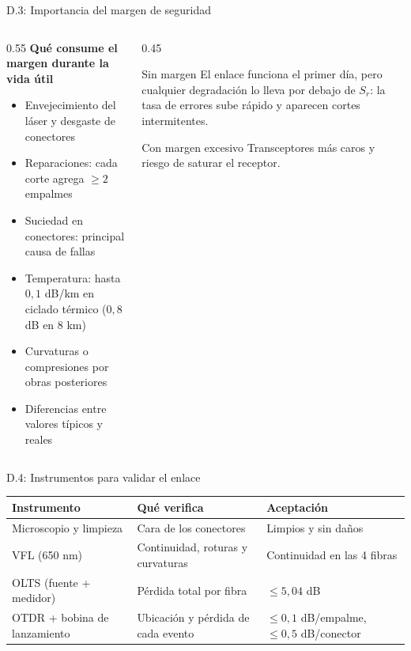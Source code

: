 \documentclass[aspectratio=1610]{beamer}
\begin{document}
\begin{frame}{D.3: Importancia del margen de seguridad}
  \begin{columns}[T]
    \begin{column}{0.55\textwidth}
      \textbf{Qué consume el margen durante la vida útil}
      \begin{itemize}
        \item Envejecimiento del láser y desgaste de conectores
        \item Reparaciones: cada corte agrega $\geq 2$ empalmes
        \item Suciedad en conectores: principal causa de fallas
        \item Temperatura: hasta $0{,}1$ dB/km en ciclado térmico ($0{,}8$ dB en 8 km)
        \item Curvaturas o compresiones por obras posteriores
        \item Diferencias entre valores típicos y reales
      \end{itemize}
    \end{column}
    \begin{column}{0.45\textwidth}
      \begin{block}{Sin margen}
        El enlace funciona el primer día, pero cualquier degradación lo lleva por debajo de $S_r$: la tasa de errores sube rápido y aparecen cortes intermitentes.
      \end{block}
      \begin{block}{Con margen excesivo}
        Transceptores más caros y riesgo de saturar el receptor.
      \end{block}
    \end{column}
  \end{columns}
\end{frame}

\begin{frame}{D.4: Instrumentos para validar el enlace}
  \small
  \begin{tabular}{>{\raggedright\arraybackslash}p{3.2cm}>{\raggedright\arraybackslash}p{3.9cm}>{\raggedright\arraybackslash}p{3.3cm}}
    \toprule
    \textbf{Instrumento} & \textbf{Qué verifica} & \textbf{Aceptación} \\
    \midrule
    Microscopio y limpieza & Cara de los conectores & Limpios y sin daños \\
    VFL (650 nm) & Continuidad, roturas y curvaturas & Continuidad en las 4 fibras \\
    OLTS (fuente + medidor) & Pérdida total por fibra & $\leq 5{,}04$ dB \\
    OTDR + bobina de lanzamiento & Ubicación y pérdida de cada evento & $\leq 0{,}1$ dB/empalme, $\leq 0{,}5$ dB/conector \\
    \bottomrule
  \end{tabular}
\end{frame}
\end{document}

